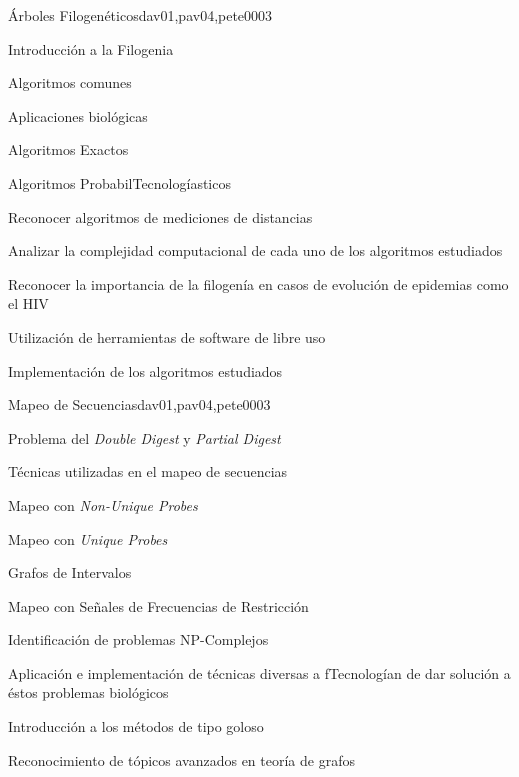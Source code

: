 \begin{syllabus}
\begin{unit}{Árboles Filogenéticos}{dav01,pav04,pete00}{0}{3}
\begin{topics}
        \item Introducción a la Filogenia
        \item Algoritmos comunes
        \item Aplicaciones biológicas
        \item Algoritmos Exactos
        \item Algoritmos ProbabilTecnologíasticos
    \end{topics}
    \begin{unitgoals}
        \item Reconocer algoritmos de mediciones de distancias
        \item Analizar la complejidad computacional de cada uno de los algoritmos estudiados
        \item Reconocer la importancia de la filogenía en casos de evolución de epidemias como el HIV
        \item Utilización de herramientas de software de libre uso
        \item Implementación de los algoritmos estudiados
    \end{unitgoals}
\end{unit}

\begin{unit}{Mapeo de Secuencias}{dav01,pav04,pete00}{0}{3}
\begin{topics}
        \item Problema del \textit{Double Digest} y \textit{Partial Digest}
        \item Técnicas utilizadas en el mapeo de secuencias
        \item Mapeo con \textit{Non-Unique Probes}
        \item Mapeo con \textit{Unique Probes}
        \item Grafos de Intervalos
        \item Mapeo con Señales de Frecuencias de Restricción
    \end{topics}
    \begin{unitgoals}
        \item Identificación de problemas NP-Complejos
        \item Aplicación e implementación de técnicas diversas a fTecnologían de dar solución a éstos problemas biológicos
        \item Introducción a los métodos de tipo goloso
        \item Reconocimiento de tópicos avanzados en teoría de grafos
    \end{unitgoals}
\end{unit}


\end{syllabus}
